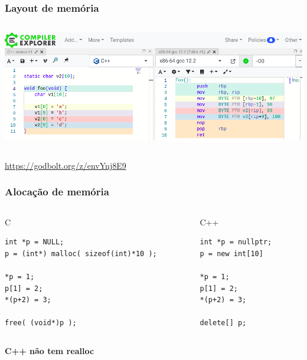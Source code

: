 \documentclass[xcolor={usenames,dvipsnames},12pt,presentation,aspectratio=169]{beamer}
\begin{document}
\begin{frame}[fragile]
  \frametitle{Layout de memória}
  \begin{columns}
    \begin{column}{\textwidth}
      \begin{center}
    \includegraphics[width=\textwidth]{gcc.png}
      \end{center}
    \end{column}
  \end{columns}
  {\footnotesize \url{https://godbolt.org/z/envYnj8E9}}
\end{frame}
\begin{frame}[fragile]
  \frametitle{Alocação de memória}
  \vspace{-2mm}
    \begin{columns}
      \begin{column}{0.55\textwidth}
\begin{block}{C}
\begin{lstlisting}
int *p = NULL;
p = (int*) malloc( sizeof(int)*10 );

*p = 1;
p[1] = 2;
*(p+2) = 3;

free( (void*)p );
\end{lstlisting}
\end{block}
     \end{column}
      \begin{column}{0.35\textwidth}
  \begin{block}{C++}
\begin{lstlisting}
int *p = nullptr;
p = new int[10]

*p = 1;
p[1] = 2;
*(p+2) = 3;

delete[] p;
\end{lstlisting}
\end{block}
      \end{column}
    \end{columns}
  \begin{center}
  \alert{\large \textbf{C++ não tem realloc}}
  \end{center}
\end{frame}
\end{document}
